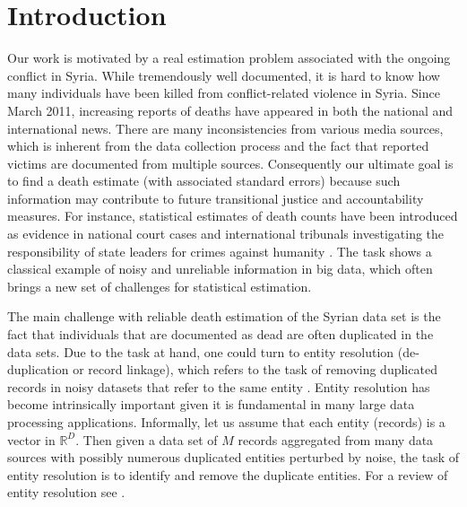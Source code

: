 \documentclass[aoas]{imsart}
\begin{document}
\section{Introduction}
\label{sec:intro}

Our work is motivated by a real estimation problem associated with the ongoing conflict in Syria. While tremendously well documented, it is hard to know how many individuals have been killed from conflict-related violence in Syria. Since March 2011, increasing reports of deaths have appeared in both the national and international news. There are many inconsistencies from various media sources, which is inherent from the data collection process and the fact that reported victims are documented from multiple sources. Consequently our ultimate goal is to find a death estimate (with associated standard errors) because such information may contribute to future transitional justice and accountability measures. For instance, statistical estimates of death counts have been introduced as evidence in national court cases and international tribunals investigating the responsibility of state leaders for crimes against humanity \citep{hrdag-2017}. The task shows a classical example of noisy and unreliable information in big data, which often brings a new set of challenges for statistical estimation.

The main challenge with reliable death estimation of the Syrian data set is the fact that individuals that are documented as dead are often duplicated in the data sets. Due to the task at hand, one could turn to entity resolution  (de-duplication or record linkage), which refers to the task of removing duplicated records in noisy datasets that refer to the same entity  \citep{liseo_2011, sadinle_2014, getoor_2006, gutman_2013,  McCallumWellner04, fellegi_1969}. Entity resolution has become intrinsically important given it is fundamental in many large data processing applications. Informally, let us assume that each entity (records) is a vector in $\mathbb{R}^D$. Then given a data set of $M$ records aggregated from many data sources with possibly numerous duplicated entities perturbed by noise, the task of entity resolution is to identify and remove the duplicate entities. For a review of entity resolution see \citep{winkler_2006, christen_2012, liseo2013some}.
\end{document}
